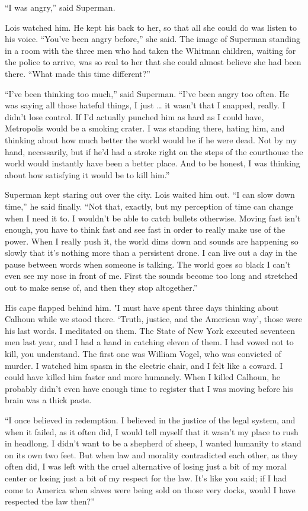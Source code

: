 ``I was angry,'' said Superman.

Lois watched him. He kept his back to her, so that all she could do was
listen to his voice. ``You've been angry before,'' she said. The image
of Superman standing in a room with the three men who had taken the
Whitman children, waiting for the police to arrive, was so real to her
that she could almost believe she had been there. ``What made this time
different?''

``I've been thinking too much,'' said Superman. ``I've been angry too
often. He was saying all those hateful things, I just \ldots{} it wasn't
that I snapped, really. I didn't lose control. If I'd actually punched
him as hard as I could have, Metropolis would be a smoking crater. I was
standing there, hating him, and thinking about how much better the world
would be if he were dead. Not by my hand, necessarily, but if he'd had a
stroke right on the steps of the courthouse the world would instantly
have been a better place. And to be honest, I was thinking about how
satisfying it would be to kill him.''

Superman kept staring out over the city. Lois waited him out. ``I can
slow down time,'' he said finally. ``Not that, exactly, but my
perception of time can change when I need it to. I wouldn't be able to
catch bullets otherwise. Moving fast isn't enough, you have to think
fast and see fast in order to really make use of the power. When I
really push it, the world dims down and sounds are happening so slowly
that it's nothing more than a persistent drone. I can live out a day in
the pause between words when someone is talking. The world goes so black
I can't even see my nose in front of me. First the sounds become too
long and stretched out to make sense of, and then they stop
altogether.''

His cape flapped behind him. "I must have spent three days thinking
about Calhoun while we stood there. `Truth, justice, and the American
way', those were his last words. I meditated on them. The State of New
York executed seventeen men last year, and I had a hand in catching
eleven of them. I had vowed not to kill, you understand. The first one
was William Vogel, who was convicted of murder. I watched him spasm in
the electric chair, and I felt like a coward. I could have killed him
faster and more humanely. When I killed Calhoun, he probably didn't even
have enough time to register that I was moving before his brain was a
thick paste.

``I once believed in redemption. I believed in the justice of the legal
system, and when it failed, as it often did, I would tell myself that it
wasn't my place to rush in headlong. I didn't want to be a shepherd of
sheep, I wanted humanity to stand on its own two feet. But when law and
morality contradicted each other, as they often did, I was left with the
cruel alternative of losing just a bit of my moral center or losing just
a bit of my respect for the law. It's like you said; if I had come to
America when slaves were being sold on those very docks, would I have
respected the law then?''

